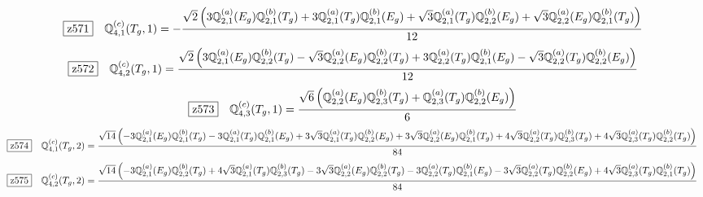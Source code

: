 \documentclass[fleqn,10pt,landscape]{jsarticle}
\begin{document}
\begin{dmath*}
\hspace*{3mm}\fbox{z571}\quad \mathbb{Q}_{4,1}^{(c)}(T_{g},1)=- \frac{\sqrt{2} \left(3 \mathbb{Q}_{2,1}^{(a)}(E_{g}) \mathbb{Q}_{2,1}^{(b)}(T_{g}) + 3 \mathbb{Q}_{2,1}^{(a)}(T_{g}) \mathbb{Q}_{2,1}^{(b)}(E_{g}) + \sqrt{3} \mathbb{Q}_{2,1}^{(a)}(T_{g}) \mathbb{Q}_{2,2}^{(b)}(E_{g}) + \sqrt{3} \mathbb{Q}_{2,2}^{(a)}(E_{g}) \mathbb{Q}_{2,1}^{(b)}(T_{g})\right)}{12}
\end{dmath*}
\begin{dmath*}
\hspace*{3mm}\fbox{z572}\quad \mathbb{Q}_{4,2}^{(c)}(T_{g},1)=\frac{\sqrt{2} \left(3 \mathbb{Q}_{2,1}^{(a)}(E_{g}) \mathbb{Q}_{2,2}^{(b)}(T_{g}) - \sqrt{3} \mathbb{Q}_{2,2}^{(a)}(E_{g}) \mathbb{Q}_{2,2}^{(b)}(T_{g}) + 3 \mathbb{Q}_{2,2}^{(a)}(T_{g}) \mathbb{Q}_{2,1}^{(b)}(E_{g}) - \sqrt{3} \mathbb{Q}_{2,2}^{(a)}(T_{g}) \mathbb{Q}_{2,2}^{(b)}(E_{g})\right)}{12}
\end{dmath*}
\begin{dmath*}
\hspace*{3mm}\fbox{z573}\quad \mathbb{Q}_{4,3}^{(c)}(T_{g},1)=\frac{\sqrt{6} \left(\mathbb{Q}_{2,2}^{(a)}(E_{g}) \mathbb{Q}_{2,3}^{(b)}(T_{g}) + \mathbb{Q}_{2,3}^{(a)}(T_{g}) \mathbb{Q}_{2,2}^{(b)}(E_{g})\right)}{6}
\end{dmath*}
\begin{dmath*}
\hspace*{3mm}\fbox{z574}\quad \mathbb{Q}_{4,1}^{(c)}(T_{g},2)=\frac{\sqrt{14} \left(- 3 \mathbb{Q}_{2,1}^{(a)}(E_{g}) \mathbb{Q}_{2,1}^{(b)}(T_{g}) - 3 \mathbb{Q}_{2,1}^{(a)}(T_{g}) \mathbb{Q}_{2,1}^{(b)}(E_{g}) + 3 \sqrt{3} \mathbb{Q}_{2,1}^{(a)}(T_{g}) \mathbb{Q}_{2,2}^{(b)}(E_{g}) + 3 \sqrt{3} \mathbb{Q}_{2,2}^{(a)}(E_{g}) \mathbb{Q}_{2,1}^{(b)}(T_{g}) + 4 \sqrt{3} \mathbb{Q}_{2,2}^{(a)}(T_{g}) \mathbb{Q}_{2,3}^{(b)}(T_{g}) + 4 \sqrt{3} \mathbb{Q}_{2,3}^{(a)}(T_{g}) \mathbb{Q}_{2,2}^{(b)}(T_{g})\right)}{84}
\end{dmath*}
\begin{dmath*}
\hspace*{3mm}\fbox{z575}\quad \mathbb{Q}_{4,2}^{(c)}(T_{g},2)=\frac{\sqrt{14} \left(- 3 \mathbb{Q}_{2,1}^{(a)}(E_{g}) \mathbb{Q}_{2,2}^{(b)}(T_{g}) + 4 \sqrt{3} \mathbb{Q}_{2,1}^{(a)}(T_{g}) \mathbb{Q}_{2,3}^{(b)}(T_{g}) - 3 \sqrt{3} \mathbb{Q}_{2,2}^{(a)}(E_{g}) \mathbb{Q}_{2,2}^{(b)}(T_{g}) - 3 \mathbb{Q}_{2,2}^{(a)}(T_{g}) \mathbb{Q}_{2,1}^{(b)}(E_{g}) - 3 \sqrt{3} \mathbb{Q}_{2,2}^{(a)}(T_{g}) \mathbb{Q}_{2,2}^{(b)}(E_{g}) + 4 \sqrt{3} \mathbb{Q}_{2,3}^{(a)}(T_{g}) \mathbb{Q}_{2,1}^{(b)}(T_{g})\right)}{84}
\end{dmath*}
\end{document}
